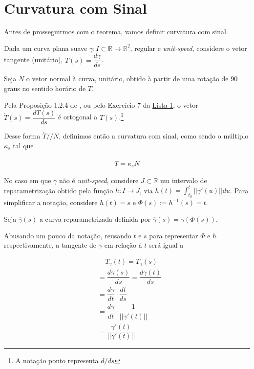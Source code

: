 \documentclass[12pt,letterpaper]{article}
\newcommand{\real}{\mathbb{R}}
\newcommand{\rr}{\mathbb{R}^2}
\begin{document}
	\tableofcontents
	\newpage
	\section{Curvatura com Sinal}
	
	Antes de prosseguirmos com o teorema, vamos definir curvatura com sinal.
	
	Dada um curva plana suave $\gamma:I\subset\real\to\rr$,  regular e \textit{unit-speed}, considere o vetor tangente (unitário), $T(s)=\dfrac{d\gamma}{ds}$.
	
	Seja $N$ o vetor normal à curva, unitário, obtido à partir de uma rotação de 90 graus no sentido horário de $T$.
	
	Pela Proposição 1.2.4 de \cite{pressley2001elementary}, ou pelo Exercício 7 da \href{https://github.com/reneroliveira/Curves_and_Surfaces/blob/main/lists/list1.pdf}{Lista 1}, o vetor $\dot{T}(s)=\dfrac{dT(s)}{ds}$ é ortogonal a $T(s)$.\footnote{A notação ponto representa $d/ds$}
	
	Desse forma $\dot{T}//N$, definimos então a curvatura com sinal, como sendo o múltiplo $\kappa_s$ tal que 
	
	\begin{align}\dot{T}=\kappa_sN\label{tdot}\end{align}
	
	No caso em que $\gamma$ não é \textit{unit-speed}, considere $J\subset\real$ um intervalo de reparametrização obtido pela função $h:I\to J$, via $h(t)=\int_{t_0}^t||\gamma'(u)||du$. Para simplificar a notação, considere $h(t)=s$ e $\Phi(s):=h^{-1}(s)=t$.
	
	Seja $\overline{\gamma}(s)$ a curva reparametrizada definida por $\overline{\gamma}(s)=\gamma(\Phi(s))$. 
	
	Abusando um pouco da notação, reusando $t$ e $s$ para representar $\Phi$ e $h$ respectivamente, a tangente de $\gamma$ em relação à $t$ será igual a 
	
	\begin{align}
		&~~~~~T_{\gamma}(t)=T_{\overline{\gamma}}(s)\nonumber\\
		&=\dfrac{d\overline{\gamma}(s)}{ds}=\dfrac{d\gamma(t)}{ds}\nonumber
		\\&=\dfrac{d\gamma}{dt}\cdot\dfrac{dt}{ds}\label{chainrule}\\
		&=\dfrac{d\gamma}{dt}\cdot\dfrac{1}{||\gamma'(t)||}\label{invft}\\
		&=\dfrac{\gamma'(t)}{||\gamma'(t)||}\nonumber
	\end{align}
\end{document}
